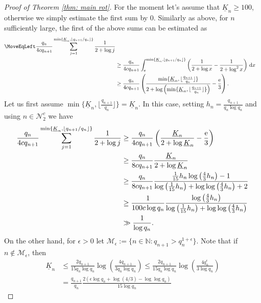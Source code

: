 \documentclass[11pt]{amsart}
\theoremstyle{definition}
\numberwithin{equation}{section}
\begin{document}
\begin{proof}[Proof of Theorem \ref{thm: main rot}]
For the moment let's assume that $\underline{K}_n\geq 100$, otherwise we simply estimate the first sum by $0$.
Similarly as above, for $n$ sufficiently large, the first of the above sums can be estimated as  
\begin{align*}
 \MoveEqLeft\frac{q_n}{4cq_{n+1}} \sum_{j=1}^{\min \{\underline{K}_n, \lfloor q_{n+1}/q_n\rfloor\}}\frac{1}{2+\log j}\notag\\
 &\geq \frac{q_n }{4cq_{n+1}}\int_{ \mathrm{e}}^{\min \{\underline{K}_n, \lfloor q_{n+1}/q_n\rfloor\}}\left(
 \frac{1}{2+ \log x}-\frac{1}{2+\log^2x}\right)\,\mathrm{d}x\notag\\
 &\geq \frac{q_n }{4cq_{n+1}}\left( \frac{\min\{\underline{K}_n, \lfloor \frac{q_{n+1}}{q_n}\rfloor\}}{2+ \log \left(\min\{\underline{K}_n, \lfloor \frac{q_{n+1}}{q_n}\rfloor\}\right)}- 
 \frac{\mathrm{e}}{3}\right).
\end{align*} 
Let us first assume $\min\{\underline{K}_n, \lfloor \frac{q_{n+1}}{q_n}\rfloor\}= \underline{K}_n$. In this case, setting $h_n=\frac{q_{n+1}}{q_n\log q_n}$ and using $n\in\mathcal{N}_2^c$ we have 
\begin{align}
 \frac{q_n}{4cq_{n+1}} \sum_{j=1}^{\min \{\underline{K}_n, \lfloor q_{n+1}/q_n\rfloor\}}\frac{1}{2+\log j}
 &\geq \frac{q_n }{4cq_{n+1}}\left( \frac{\underline{K}_n}{2+\log \underline{K}_n}- 
 \frac{\mathrm{e}}{3}\right)\notag\\
  &\geq \frac{q_n }{8cq_{n+1}} \frac{\underline{K}_n}{2+\log \underline{K}_n}\notag\\
 &\geq \frac{q_n}{8cq_{n+1}}\frac{  \frac{1}{15} h_n \log\left(\frac{4}{3} h_n\right)-1}{\log\left( \frac{1}{15}h_n\right)+\log\log \left(\frac{4}{3} h_n\right)+2}\notag\\
&\geq \frac{1}{100c\log q_n}\frac{ \log\left(\frac{4}{3} h_n\right)}{\log\left( \frac{1}{15}h_n\right)+\log\log \left(\frac{4}{3} h_n\right)}\notag\\
 &\gg \frac{1}{\log q_n}.\label{eq: lambda lower B1}
\end{align}
On the other hand, for $\epsilon>0$ let 
$ \mathcal{M}_{\epsilon}:=\{n\in\mathbb{N}: q_{n+1}> q_n^{1+\epsilon}\}$. 
Note that if $n\notin \mathcal{M}_{\epsilon}$, then 
\begin{align*}
 \underline{K}_n
 &\leq  \frac{2 q_{n+1}}{15 q_n\log q_n}\log\left( \frac{4 q_{n+1}}{3 q_n\log q_n}\right)
 \leq  \frac{2 q_{n+1}}{15 q_n\log q_n}\log\left( \frac{4 q_{n}^{\epsilon}}{3 \log q_n}\right)\\
 &= \frac{q_{n+1}}{q_n}\frac{2\left(\epsilon \log q_n+ \log( 4/3)-\log\log q_n\right)}{15 \log q_n}

\end{align*}
\end{proof}
\end{document}
